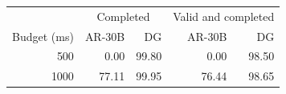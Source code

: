 \begin{tabular}{@{}rrrrr@{}}
\toprule
& \multicolumn{2}{c}{Completed} & \multicolumn{2}{c}{Valid and completed} \\
Budget (ms) & AR-30B & DG & AR-30B & DG \\
\midrule
500 & 0.00 & 99.80 & 0.00 & 98.50 \\
1000 & 77.11 & 99.95 & 76.44 & 98.65 \\
\bottomrule
\end{tabular}
